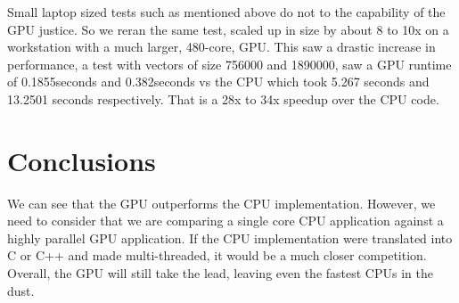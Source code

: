 \documentclass[12pt]{article}
\begin{document}
Small laptop sized tests such as mentioned above do not to the capability of the GPU justice. So we reran the same test, scaled up in size by about 8 to 10x on a workstation with a much larger, 480-core, GPU. This saw a drastic increase in performance, a test with vectors of size 756000 and 1890000, saw a GPU runtime of 0.1855seconds and 0.382seconds vs the CPU which took 5.267 seconds and 13.2501 seconds respectively. That is a 28x to 34x speedup over the CPU code.

\section{Conclusions}
We can see that the GPU outperforms the CPU implementation. However, we need to consider that we are comparing a single core CPU application against a highly parallel GPU application. If the CPU implementation were translated into C or C++ and made multi-threaded, it would be a much closer competition. Overall, the GPU will still take the lead, leaving even the fastest CPUs in the dust.



\end{document}
